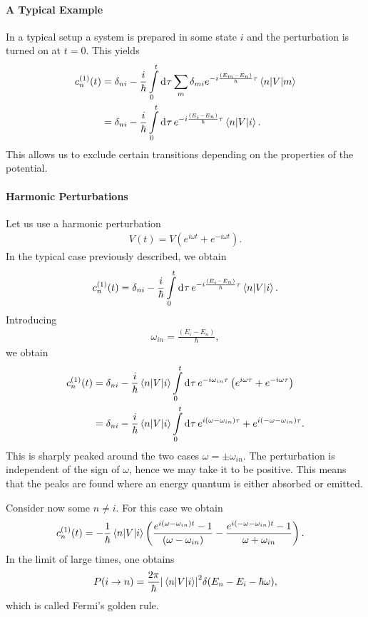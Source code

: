 \paragraph{A Typical Example}
In a typical setup a system is prepared in some state $i$ and the perturbation is turned on at $t = 0$. This yields
\begin{align*}
	c_{n}^{(1)}(t) &= \delta_{ni} - \frac{i}{\hbar}\int\limits_{0}^{t}\dd[]{\tau}\sum\limits_{m}\delta_{mi}e^{-i\frac{(E_{m} - E_{n})}{\hbar}\tau}\mel{n}{V}{m} \\
	               &= \delta_{ni} - \frac{i}{\hbar}\int\limits_{0}^{t}\dd[]{\tau}e^{-i\frac{(E_{i} - E_{n})}{\hbar}\tau}\mel{n}{V}{i}.
\end{align*}
This allows us to exclude certain transitions depending on the properties of the potential.

\paragraph{Harmonic Perturbations}
Let us use a harmonic perturbation
\begin{align*}
	V(t) = V\left(e^{i\omega t} + e^{-i\omega t}\right).
\end{align*}
In the typical case previously described, we obtain
\begin{align*}
	c_{n}^{(1)}(t) = \delta_{ni} - \frac{i}{\hbar}\int\limits_{0}^{t}\dd[]{\tau}e^{-i\frac{(E_{i} - E_{n})}{\hbar}\tau}\mel{n}{V}{i}.
\end{align*}
Introducing
\begin{align*}
	\omega_{in} = \frac{(E_{i} - E_{n})}{\hbar},
\end{align*}
we obtain
\begin{align*}
	c_{n}^{(1)}(t) &= \delta_{ni} - \frac{i}{\hbar}\mel{n}{V}{i}\int\limits_{0}^{t}\dd[]{\tau}e^{-i\omega_{in}\tau}\left(e^{i\omega\tau} + e^{-i\omega\tau}\right) \\
	               &= \delta_{ni} - \frac{i}{\hbar}\mel{n}{V}{i}\int\limits_{0}^{t}\dd[]{\tau}e^{i(\omega - \omega_{in})\tau} + e^{i(-\omega - \omega_{in})\tau}.
\end{align*}
This is sharply peaked around the two cases $\omega = \pm \omega_{in}$. The perturbation is independent of the sign of $\omega$, hence we may take it to be positive. This means that the peaks are found where an energy quantum is either absorbed or emitted.

Consider now some $n\neq i$. For this case we obtain
\begin{align*}
	c_{n}^{(1)}(t) &= -\frac{1}{\hbar}\mel{n}{V}{i}\left(\frac{e^{i(\omega - \omega_{in})t} - 1}{(\omega - \omega_{in})} - \frac{e^{i(-\omega - \omega_{in})t} - 1}{\omega + \omega_{in}}\right).
\end{align*}
In the limit of large times, one obtains
\begin{align*}
	P(i\to n) = \frac{2\pi}{\hbar}\abs{\mel{n}{V}{i}}^{2}\delta(E_{n} - E_{i} - \hbar\omega),
\end{align*}
which is called Fermi's golden rule.

